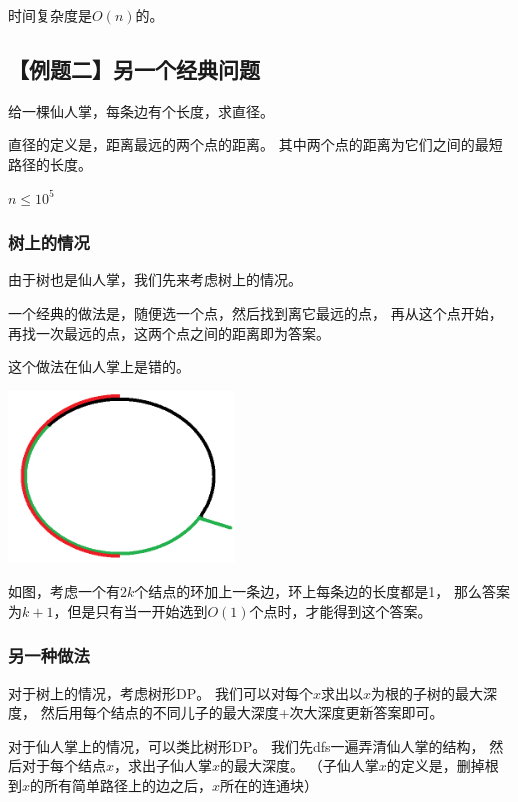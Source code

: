 \documentclass{noithesis}
\begin{document}
时间复杂度是$O(n)$的。

\subsection{【例题二】另一个经典问题}

给一棵仙人掌，每条边有个长度，求直径。

直径的定义是，距离最远的两个点的距离。
其中两个点的距离为它们之间的最短路径的长度。

$n \le 10^5$



\subsubsection{树上的情况}

由于树也是仙人掌，我们先来考虑树上的情况。

一个经典的做法是，随便选一个点，然后找到离它最远的点，
再从这个点开始，再找一次最远的点，这两个点之间的距离即为答案。

\text{}

这个做法在仙人掌上是错的。

\includegraphics[width=170pt,height=129.7pt]{images/large-cycle-and-one-edge.jpg}

如图，考虑一个有$2 k$个结点的环加上一条边，环上每条边的长度都是1，
那么答案为$k + 1$，但是只有当一开始选到$O(1)$个点时，才能得到这个答案。


\subsubsection{另一种做法}

对于树上的情况，考虑树形DP。
我们可以对每个$x$求出以$x$为根的子树的最大深度，
然后用每个结点的不同儿子的最大深度+次大深度更新答案即可。

对于仙人掌上的情况，可以类比树形DP。
我们先dfs一遍弄清仙人掌的结构，
然后对于每个结点$x$，求出子仙人掌$x$的最大深度。
（子仙人掌$x$的定义是，删掉根到$x$的所有简单路径上的边之后，$x$所在的连通块）
\end{document}
